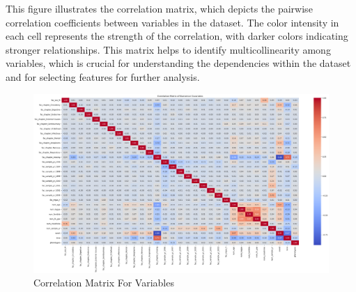 \noindent This figure illustrates the correlation matrix, which depicts the pairwise correlation coefficients between variables in the dataset. The color intensity in each cell represents the strength of the correlation, with darker colors indicating stronger relationships. This matrix helps to identify multicollinearity among variables, which is crucial for understanding the dependencies within the dataset and for selecting features for further analysis.
\begin{figure}[h]
    \centering
    \includegraphics[scale=0.28]{Figures/EDA/corr.png}
    \caption{Correlation Matrix For Variables}
    \label{fig:corr_matrix}
\end{figure}

\clearpage

